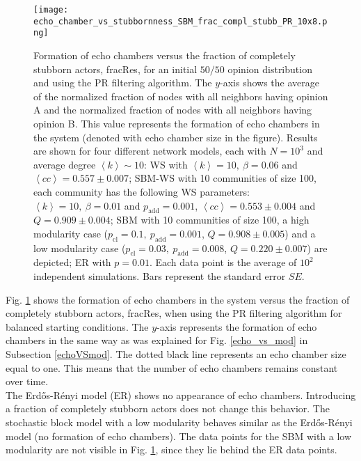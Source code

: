 \documentclass[11 pt , letterpaper , twoside , openright]{book}
\begin{document}
\begin{figure}[H]
	\texttt{[image: echo\_chamber\_vs\_stubbornness\_SBM\_frac\_compl\_stubb\_PR\_10x8.png]}
	\captionsetup{format=plain}
	\caption[Formation of echo chambers versus fraction of completely stubborn actors for the PR filtering algorithm and an initial $50/50$ opinion distribution.]{Formation of echo chambers versus the fraction of completely stubborn actors, fracRes, for an initial $50/50$ opinion distribution and using the PR filtering algorithm. The $y$-axis shows the average of the normalized fraction of nodes with all neighbors having opinion A and the normalized fraction of nodes with all neighbors having opinion B. This value represents the formation of echo chambers in the system (denoted with echo chamber size in the figure). Results are shown for four different network models, each with $N=10^3$ and average degree $\left<k\right> \sim 10$: WS with $\left<k\right> =10,\ \beta = 0.06$ and $\left<cc\right> = 0.557 \pm 0.007$; SBM-WS with 10 communities of size 100, each community has the following WS parameters: $\left<k\right> = 10,\ \beta = 0.01$ and $p_{\text{add}} = 0.001$, $\left<cc\right> = 0.553 \pm 0.004$ and $Q = 0.909 \pm 0.004$; SBM with 10 communities of size 100, a high modularity case ($p_{\text{cl}} = 0.1,\ p_{\text{add}} = 0.001$, $Q = 0.908 \pm 0.005$) and a low modularity case ($p_{\text{cl}} = 0.03,\ p_{\text{add}} = 0.008$, $Q = 0.220 \pm 0.007$) are depicted; ER with $p= 0.01$. Each data point is the average of $10^2$ independent simulations. Bars represent the standard error $SE$.}
\label{echo_vs_frac_complStubb}
\end{figure}
\noindent
Fig. \ref{echo_vs_frac_complStubb} shows the formation of echo chambers in the system versus the fraction of completely stubborn actors, fracRes, when using the PR filtering algorithm for balanced starting conditions. The $y$-axis represents the formation of echo chambers in the same way as was explained for Fig. \ref{echo_vs_mod} in Subsection \ref{echoVSmod}. The dotted black line represents an echo chamber size equal to one. This means that the number of echo chambers remains constant over time.\\
\newline
The Erd\H{o}s-R\'{e}nyi model (ER) shows no appearance of echo chambers. Introducing a fraction of completely stubborn actors does not change this behavior. The stochastic block model with a low modularity behaves similar as the Erd\H{o}s-R\'{e}nyi model (no formation of echo chambers). The data points for the SBM with a low modularity are not visible in Fig. \ref{echo_vs_frac_complStubb}, since they lie behind the ER data points.\\
\end{document}
